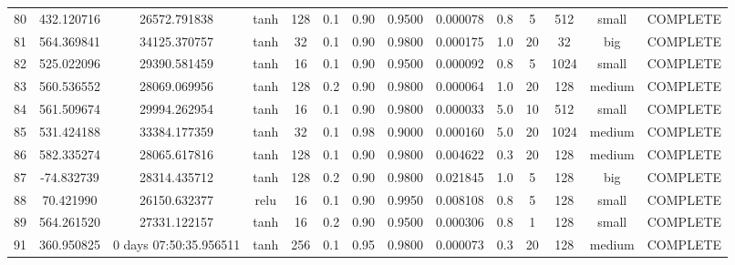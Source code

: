 \begin{longtable}{cccccccccccccc}
                       80 &                 432.120716 &                       26572.791838 &            tanh &         128 &         0.1 &        0.90 & 0.9500 &       0.000078 &             0.8 &         5 &      512 &     small & COMPLETE \\
                       81 &                 564.369841 &                       34125.370757 &            tanh &          32 &         0.1 &        0.90 & 0.9800 &       0.000175 &             1.0 &        20 &       32 &       big & COMPLETE \\
                       82 &                 525.022096 &                       29390.581459 &            tanh &          16 &         0.1 &        0.90 & 0.9500 &       0.000092 &             0.8 &         5 &     1024 &     small & COMPLETE \\
                       83 &                 560.536552 &                       28069.069956 &            tanh &         128 &         0.2 &        0.90 & 0.9800 &       0.000064 &             1.0 &        20 &      128 &    medium & COMPLETE \\
                       84 &                 561.509674 &                       29994.262954 &            tanh &          16 &         0.1 &        0.90 & 0.9800 &       0.000033 &             5.0 &        10 &      512 &     small & COMPLETE \\
                       85 &                 531.424188 &                       33384.177359 &            tanh &          32 &         0.1 &        0.98 & 0.9000 &       0.000160 &             5.0 &        20 &     1024 &    medium & COMPLETE \\
                       86 &                 582.335274 &                       28065.617816 &            tanh &         128 &         0.1 &        0.90 & 0.9800 &       0.004622 &             0.3 &        20 &      128 &    medium & COMPLETE \\
                       87 &                 -74.832739 &                       28314.435712 &            tanh &         128 &         0.2 &        0.90 & 0.9800 &       0.021845 &             1.0 &         5 &      128 &       big & COMPLETE \\
                       88 &                  70.421990 &                       26150.632377 &            relu &          16 &         0.1 &        0.90 & 0.9950 &       0.008108 &             0.8 &         5 &      128 &     small & COMPLETE \\
                       89 &                 564.261520 &                       27331.122157 &            tanh &          16 &         0.2 &        0.90 & 0.9500 &       0.000306 &             0.8 &         1 &      128 &     small & COMPLETE \\
                       91 &                 360.950825 &             0 days 07:50:35.956511 &            tanh &         256 &         0.1 &        0.95 & 0.9800 &       0.000073 &             0.3 &        20 &      128 &    medium & COMPLETE \\
\end{longtable}
